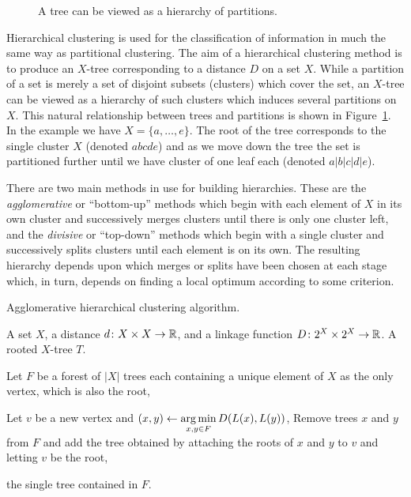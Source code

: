 \begin{figure}
  \centering
  
  \caption{A tree can be viewed as a hierarchy of partitions.}
  \label{fig:tree-clust-ex}
\end{figure}

Hierarchical clustering is used for the classification of information in much
the same way as partitional clustering.  The aim of a hierarchical clustering
method is to produce an $X$-tree corresponding to a distance $D$ on a set $X$.
While a partition of a set is merely a set of disjoint subsets (clusters)
which cover the set, an $X$-tree can be viewed as a hierarchy of such clusters
which induces several partitions on $X$.  This natural relationship between
trees and partitions is shown in Figure~\ref{fig:tree-clust-ex}.  In the
example we have $X = \{a,\dotsc,e\}$.  The root of the tree corresponds to the
single cluster $X$ (denoted $abcde$) and as we move down the tree the set is
partitioned further until we have cluster of one leaf each (denoted
$a|b|c|d|e$).

There are two main methods in use for building hierarchies.  These are the
\textit{agglomerative} or ``bottom-up'' methods which begin with each element
of $X$ in its own cluster and successively merges clusters until there is only
one cluster left, and the \textit{divisive} or ``top-down'' methods which
begin with a single cluster and successively splits clusters until each
element is on its own.  The resulting hierarchy depends upon which merges or
splits have been chosen at each stage which, in turn, depends on finding a
local optimum according to some criterion.

\begin{algorithm}[h]
  \caption{Agglomerative hierarchical clustering algorithm.}
  \label{alg:agglomerative}

  \begin{algorithmic}
    \Require A set $X$, a distance $d \colon X \times X \to {\mathbb R}$, and a
    linkage function $D \colon 2^X \times 2^X \to {\mathbb R}$.
    \Ensure  A rooted $X$-tree $T$.

    \State Let $F$ be a forest of $|X|$ trees each containing a unique element
    of $X$ as the only vertex, which is also the root,


       \State Let $v$ be a new vertex and $\displaystyle (x,y) \gets \operatorname*{arg\,min}_{x,y
         \in F} D(L(x),L(y))$,
       \State Remove trees $x$ and $y$ from $F$ and add the tree obtained by
         attaching the roots of $x$ and $y$ to $v$ and letting $v$ be the root,
    
    \EndWhile

    \State \Return the single tree contained in $F$.
    
  \end{algorithmic}
\end{algorithm}


